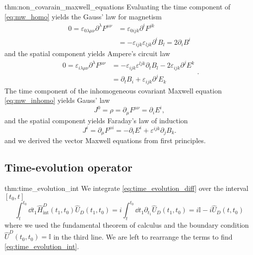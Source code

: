 \begin{delayedproof}{thm:non_covarain_maxwell_equations}
	Evaluating the time component of \cref{eq:mw_homo} yields the Gauss' law for magnetism
	\begin{equation}
		\begin{split}
			0
			=
			\varepsilon_{0\lambda\mu\nu}\partial^\lambda F^{\mu\nu}
			&=
			\varepsilon_{0ijk}\partial^iF^{jk}
			\\
			&=
			-
			\varepsilon_{ijk}\varepsilon_{ljk}
			\partial^i B_l
			=
			2\partial_iB^i
		\end{split}
		\label{eq:mw_gauss_law_mag}
	\end{equation}
	and the spatial component yields Ampere's circuit law
	\begin{equation}
		\begin{split}
			0
			=
			\varepsilon_{i\lambda\mu\nu}
			\partial^\lambda
			F^{\mu\nu}
			&=
			-
			\varepsilon_{ijk}
			\varepsilon^{ljk}
			\partial_t B_l
			-
			2\varepsilon_{ijk}
			\partial^jE^k
			\\
			&=
			\partial_tB_i
			+
			\varepsilon_{ijk}
			\partial^jE_k
		\end{split}
		\label{eq:mw_ampere_law}.
	\end{equation}
	The time component of the inhomogeneous covariant Maxwell equation \cref{eq:mw_inhomo} yields Gauss' law
	\begin{equation}
		J^0
		=
		\rho
		=
		\partial_\mu F^{\mu\nu}
		=
		\partial_i E^i
		\label{eq:mw_gauss_law},
	\end{equation}
	and the spatial component yields Faraday's law of induction
	\begin{equation}
		J^i
		=
		\partial_\mu F^{\mu i}
		=
		-\partial_t E^i
		+\varepsilon^{ijk}\partial_j B_k
		\label{eq:mw_faraday_law}.
	\end{equation}
	and we derived the vector Maxwell equations from first principles.	
\end{delayedproof}

\subsection{Time-evolution operator}

\begin{delayedproof}{thm:time_evolution_int}
	We integrate \cref{eq:time_evolution_diff} over the interval $[t_0,t]$
	\begin{equation}
		\int_t^{t_0}\dd{t_1}
		\hat{H}_\text{int}^D(t_1,t_0)
		\hat{U}_D(t_1,t_0)
		=
		i\int_t^{t_0}\dd{t_1}
		\partial_{t_1}
		\hat{U}_D(t_1,t_0)
		=
		i\mathbb{I}
		-
		i\hat{U}_D(t,t_0)
	\end{equation}
	where we used the fundamental theorem of calculus and the boundary condition $\hat{U}^D(t_0,t_0)=\mathbb{I}$ in the third line.
	We are left to rearrange the terms to find \cref{eq:time_evolution_int}.
\end{delayedproof}

